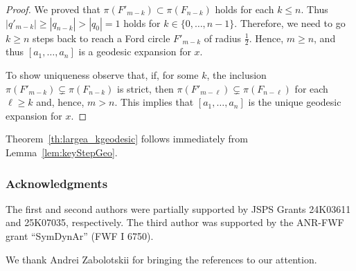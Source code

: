 \documentclass[graybox]{svmult}
\begin{document}
\begin{proof}
We proved that $\pi(F'_{m-k}) \subset \pi(F_{n-k})$ holds for each $k \le n$. Thus 
$|q'_{m-k}| \ge |q_{n-k}| > |q_0|=1$ holds for $k\in\{0,\ldots,n-1\}$. Therefore, we need to go $k\ge n$ steps back to reach a Ford circle $F'_{m-k}$ of radius $\frac12$. Hence, $m\ge n$, and thus $[a_1,\ldots, a_n]$ is a geodesic expansion for $x$.

To show uniqueness observe that, if, for some $k$, the inclusion $\pi(F'_{m-k}) \subsetneq \pi(F_{n-k})$ is strict, then $\pi(F'_{m-\ell}) \subsetneq \pi(F_{n-\ell})$ for each $\ell \ge k$ and, hence, $m>n$. This implies that $[a_1,\ldots, a_n]$ is the unique geodesic expansion for $x$.
\end{proof}

Theorem~\ref{th:largea_kgeodesic} follows immediately from Lemma~\ref{lem:keyStepGeo}.
\subsubsection*{Acknowledgments}
The first and second authors were partially supported by JSPS Grants 24K03611 and 25K07035, respectively. The third author was supported by the ANR-FWF grant ``SymDynAr'' (FWF I 6750).

We thank Andrei Zabolotskii for bringing the references \cite{hatcher1983hyperbolic,S-vS-Z} to our attention.

%
%
% 
% 
%
\end{document}
